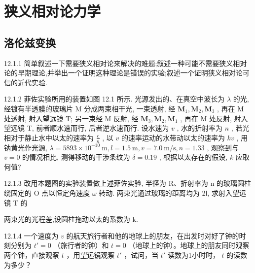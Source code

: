 \chapter{狭义相对论力学}

\section{洛伦兹变换}

\begin{problem}{12.1.1}
简单叙述一下需要狭义相对论来解决的难题;叙述一种可能不需要狭义相对论的早期理论,并举出一个证明这种理论是错误的实验;叙述一个证明狭义相对论可信的近代实验.
\end{problem}
\clearpage


\begin{problem}{12.1.2}
菲佐实验所用的装置如图 12.1 所示. 光源发出的、在真空中波长为 $\lambda$ 的光, 经镀有半透膜的玻璃片 M 分成两束相干光, 一束透射, 经 $\mathbf{M}_1, \mathbf{M}_2, \mathbf{M}_3$ , 再在 M 处透射, 射入望远镜 T; 另一束经 M 反射, 经 $\mathbf{M}_3, \mathbf{M}_2, \mathbf{M}_1$ , 再在 M 处反射, 射入望远镜 T, 前者顺水速而行, 后者逆水速而行. 设水速为 $v$ , 水的折射率为 $n$ , 若光相对于静止水中以太的速率为 $\frac{c}{n}$ , 以 $v$ 的速率运动的水带动以太的速率为 $kv$ , 用钠黄光作光源, $\lambda = 5893 \times 10^{-10} \mathrm{~m}, l = 1.5 \mathrm{~m}, v = 7.0 \mathrm{~m/s}, n = 1.33$ , 观察到与 $v = 0$ 的情况相比, 测得移动的干涉条纹为 $\delta = 0.19$ , 根据以太存在的假设, $k$ 应取何值?
\begin{center}

\end{center}
\end{problem}
\clearpage


\begin{problem}{12.1.3}
改用本题图的实验装置做上述菲佐实验, 半径为 R、折射率为 n 的玻璃圆柱绕固定的 O 点以恒定角速度 $\omega$ 转动. 两束光通过玻璃的距离均为 2l, 求射入望远镜 T 的

两束光的光程差,设圆柱拖动以太的系数为 k.
\begin{center}

\end{center}
\end{problem}
\clearpage


\begin{problem}{12.1.4}
一个速度为 $v$ 的航天旅行者和他的地球上的朋友，在出发时对好了钟的时刻分别为 $t' = 0$ （旅行者的钟）和 $t = 0$ （地球上的钟）。地球上的朋友同时观察两个钟，直接观察 $t$ ，用望远镜观察 $t'$ ，试问，当 $t'$ 读数为1小时时， $t$ 的读数为多少？
\end{problem}
\clearpage



